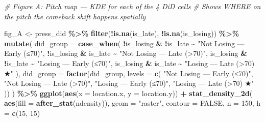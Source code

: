 \documentclass[
]{article}
\newenvironment{Shaded}{\begin{snugshade}}{\end{snugshade}}
\newcommand{\AttributeTok}[1]{\textcolor[rgb]{0.13,0.29,0.53}{#1}}
\newcommand{\CommentTok}[1]{\textcolor[rgb]{0.56,0.35,0.01}{\textit{#1}}}
\newcommand{\ConstantTok}[1]{\textcolor[rgb]{0.56,0.35,0.01}{#1}}
\newcommand{\DecValTok}[1]{\textcolor[rgb]{0.00,0.00,0.81}{#1}}
\newcommand{\FunctionTok}[1]{\textcolor[rgb]{0.13,0.29,0.53}{\textbf{#1}}}
\newcommand{\NormalTok}[1]{#1}
\newcommand{\OtherTok}[1]{\textcolor[rgb]{0.56,0.35,0.01}{#1}}
\newcommand{\SpecialCharTok}[1]{\textcolor[rgb]{0.81,0.36,0.00}{\textbf{#1}}}
\newcommand{\StringTok}[1]{\textcolor[rgb]{0.31,0.60,0.02}{#1}}
\begin{document}
\begin{Shaded}
\begin{Highlighting}[]
\CommentTok{\# Figure A: Pitch map — KDE for each of the 4 DiD cells}
\CommentTok{\# Shows WHERE on the pitch the comeback shift happens spatially}

\NormalTok{fig\_A }\OtherTok{\textless{}{-}}\NormalTok{ press\_did }\SpecialCharTok{\%\textgreater{}\%}
  \FunctionTok{filter}\NormalTok{(}\SpecialCharTok{!}\FunctionTok{is.na}\NormalTok{(is\_late), }\SpecialCharTok{!}\FunctionTok{is.na}\NormalTok{(is\_losing)) }\SpecialCharTok{\%\textgreater{}\%}
  \FunctionTok{mutate}\NormalTok{(}
    \AttributeTok{did\_group =} \FunctionTok{case\_when}\NormalTok{(}
      \SpecialCharTok{!}\NormalTok{is\_losing }\SpecialCharTok{\&} \SpecialCharTok{!}\NormalTok{is\_late }\SpecialCharTok{\textasciitilde{}} \StringTok{"Not Losing — Early (≤70\textquotesingle{})"}\NormalTok{,}
      \SpecialCharTok{!}\NormalTok{is\_losing }\SpecialCharTok{\&}\NormalTok{  is\_late }\SpecialCharTok{\textasciitilde{}} \StringTok{"Not Losing — Late (\textgreater{}70\textquotesingle{})"}\NormalTok{,}
\NormalTok{       is\_losing }\SpecialCharTok{\&} \SpecialCharTok{!}\NormalTok{is\_late }\SpecialCharTok{\textasciitilde{}} \StringTok{"Losing — Early (≤70\textquotesingle{})"}\NormalTok{,}
\NormalTok{       is\_losing }\SpecialCharTok{\&}\NormalTok{  is\_late }\SpecialCharTok{\textasciitilde{}} \StringTok{"Losing — Late (\textgreater{}70\textquotesingle{}) ★"}
\NormalTok{    ),}
    \AttributeTok{did\_group =} \FunctionTok{factor}\NormalTok{(did\_group, }\AttributeTok{levels =} \FunctionTok{c}\NormalTok{(}
      \StringTok{"Not Losing — Early (≤70\textquotesingle{})"}\NormalTok{, }\StringTok{"Not Losing — Late (\textgreater{}70\textquotesingle{})"}\NormalTok{,}
      \StringTok{"Losing — Early (≤70\textquotesingle{})"}\NormalTok{,     }\StringTok{"Losing — Late (\textgreater{}70\textquotesingle{}) ★"}
\NormalTok{    ))}
\NormalTok{  ) }\SpecialCharTok{\%\textgreater{}\%}
  \FunctionTok{ggplot}\NormalTok{(}\FunctionTok{aes}\NormalTok{(}\AttributeTok{x =}\NormalTok{ location.x, }\AttributeTok{y =}\NormalTok{ location.y)) }\SpecialCharTok{+}
  \FunctionTok{stat\_density\_2d}\NormalTok{(}
    \FunctionTok{aes}\NormalTok{(}\AttributeTok{fill =} \FunctionTok{after\_stat}\NormalTok{(ndensity)),}
    \AttributeTok{geom    =} \StringTok{"raster"}\NormalTok{,}
    \AttributeTok{contour =} \ConstantTok{FALSE}\NormalTok{,}
    \AttributeTok{n       =} \DecValTok{150}\NormalTok{,}
    \AttributeTok{h       =} \FunctionTok{c}\NormalTok{(}\DecValTok{15}\NormalTok{, }\DecValTok{15}\NormalTok{)}

\end{Highlighting}
\end{Shaded}
\end{document}
